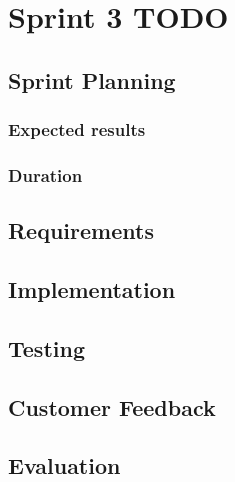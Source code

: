 \section{Sprint 3 TODO}

	\subsection{Sprint Planning}

	\subsubsection{Expected results}
	
	\subsubsection{Duration}

	\subsection{Requirements}

	\subsection{Implementation}

	\subsection{Testing}

	\subsection{Customer Feedback}

	\subsection{Evaluation}

